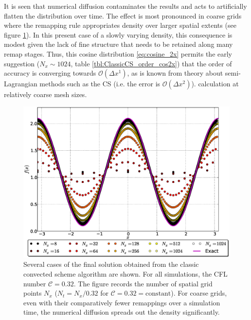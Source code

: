 \documentclass[11pt,titlepage]{report}
\begin{document}
\begin{table}
{{\begin{minipage}{0.65\hsize}
\captionsetup{width=0.75\hsize}  
 \label{fig:ClassicCS_cos2x}
\end{minipage}
}}
\end{table}

It is seen that numerical diffusion contaminates the results and acts to artificially flatten the distribution over time. The effect is most pronounced in coarse grids where the remapping rule appropriates density over larger spatial extents (see figure \ref{fig:ClassicCS_cos2x_several_cases}). In this present case of a slowly varying density, this consequence is modest given the lack of fine structure that needs to be retained along many remap stages. Thus, this cosine distribution \eqref{eq:cosine_2x} permits the early suggestion ($N_x \sim 1024$, table \ref{tbl:ClassicCS_order_cos2x}) that the order of accuracy is converging towards $\mathcal{O}(\Delta x^1)$, as is known from theory about semi-Lagrangian methods such as the CS \cite{Besse08} (i.e. the error is $\mathcal{O}(\Delta x^2)$). calculation at relatively coarse mesh sizes.

\begin{figure}[h!]
 \centering
   \includegraphics[width=\textwidth]{graphics/plot_-_ClassicCS_cosine2x_Nxall.eps}
 \caption{Several cases of the final solution obtained from the classic convected scheme algorithm are shown. For all simulations, the CFL number $\mathcal{C} = 0.32$. The figure records the number of spatial grid points $N_x$ ($N_t = N_x / 0.32$ for $\mathcal{C} = 0.32 = \text{constant}$). For coarse grids, even with their comparatively fewer remappings over a simulation time, the numerical diffusion spreads out the density significantly.}
 \label{fig:ClassicCS_cos2x_several_cases}
\end{figure}
\end{document}
